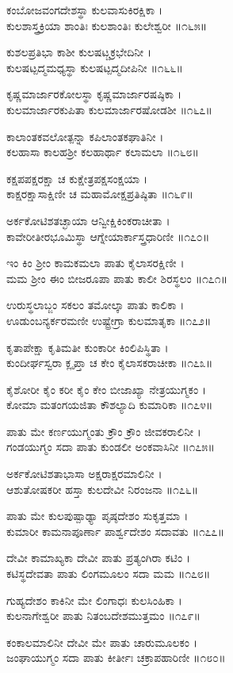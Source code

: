 ಕಂಬೋಜವಂಗದೇಶಸ್ಥಾ ಕುಲವಾಸುಕಿರಕ್ಷಿಕಾ ।\\
ಕುಲಶಾಸ್ತ್ರಕ್ರಿಯಾ ಶಾಂತಿಃ ಕುಲಶಾಂತಿಃ ಕುಲೇಶ್ವರೀ ॥೧೬೫॥

ಕುಶಲಪ್ರತಿಭಾ ಕಾಶೀ ಕುಲಷಟ್ಚಕ್ರಭೇದಿನೀ ।\\
ಕುಲಷಟ್ಪದ್ಮಮಧ್ಯಸ್ಥಾ ಕುಲಷಟ್ಪದ್ಮದೀಪಿನೀ ॥೧೬೬॥

ಕೃಷ್ಣಮಾರ್ಜಾರಕೋಲಸ್ಥಾ ಕೃಷ್ಣಮಾರ್ಜಾರಷಷ್ಠಿಕಾ ।\\
ಕುಲಮಾರ್ಜಾರಕುಪಿತಾ ಕುಲಮಾರ್ಜಾರಷೋಡಶೀ ॥೧೬೭॥

ಕಾಲಾಂತಕವಲೋತ್ಪನ್ನಾ ಕಪಿಲಾಂತಕಘಾತಿನೀ ।\\
ಕಲಹಾಸಾ ಕಾಲಹಶ್ರೀ ಕಲಹಾರ್ಥಾ ಕಲಾಮಲಾ ॥೧೬೮॥

ಕಕ್ಷಪಪಕ್ಷರಕ್ಷಾ ಚ ಕುಕ್ಷೇತ್ರಪಕ್ಷಸಂಕ್ಷಯಾ ।\\
ಕಾಕ್ಷರಕ್ಷಾಸಾಕ್ಷಿಣೀ ಚ ಮಹಾಮೋಕ್ಷಪ್ರತಿಷ್ಠಿತಾ ॥೧೬೯॥

ಅರ್ಕಕೋಟಿಶತಚ್ಛಾಯಾ ಆನ್ವೀಕ್ಷಿಕಿಂಕರಾಚೀತಾ ।\\
ಕಾವೇರೀತೀರಭೂಮಿಸ್ಥಾ ಆಗ್ನೇಯಾರ್ಕಾಸ್ತ್ರಧಾರಿಣೀ ॥೧೭೦॥

ಇಂ ಕಿಂ ಶ್ರೀಂ ಕಾಮಕಮಲಾ ಪಾತು ಕೈಲಾಸರಕ್ಷಿಣೀ ।\\
ಮಮ ಶ್ರೀಂ ಈಂ ಬೀಜರೂಪಾ ಪಾತು ಕಾಲೀ ಶಿರಸ್ಥಲಂ ॥೧೭೧॥

ಉರುಸ್ಥಲಾಬ್ಜಂ ಸಕಲಂ ತಮೋಲ್ಕಾ ಪಾತು ಕಾಲಿಕಾ ।\\
ಊಡುಂಬನ್ಯರ್ಕರಮಣೀ ಉಷ್ಟ್ರೇಗ್ರಾ ಕುಲಮಾತೃಕಾ ॥೧೭೨॥

ಕೃತಾಪೇಕ್ಷಾ ಕೃತಿಮತೀ ಕುಂಕಾರೀ ಕಿಂಲಿಪಿಸ್ಥಿತಾ ।\\
ಕುಂದೀರ್ಘಸ್ವರಾ ಕ್ಲೃಪ್ತಾ ಚ ಕೇಂ ಕೈಲಾಸಕರಾಚೀಕಾ ॥೧೭೩॥

ಕೈಶೋರೀ ಕೈಂ ಕರೀ ಕೈಂ ಕೇಂ ಬೀಜಾಖ್ಯಾ ನೇತ್ರಯುಗ್ಮಕಂ ।\\
ಕೋಮಾ ಮತಂಗಯಜಿತಾ ಕೌಶಲ್ಯಾದಿ ಕುಮಾರಿಕಾ ॥೧೭೪॥

ಪಾತು ಮೇ ಕರ್ಣಯುಗ್ಮಂತು ಕ್ರೌಂ ಕ್ರೌಂ ಜೀವಕರಾಲಿನೀ ।\\
ಗಂಡಯುಗ್ಮಂ ಸದಾ ಪಾತು ಕುಂಡಲೀ ಅಂಕವಾಸಿನೀ ॥೧೭೫॥

ಅರ್ಕಕೋಟಿಶತಾಭಾಸಾ ಅಕ್ಷರಾಕ್ಷರಮಾಲಿನೀ ।\\
ಆಶುತೋಷಕರೀ ಹಸ್ತಾ ಕುಲದೇವೀ ನಿರಂಜನಾ ॥೧೭೬॥

ಪಾತು ಮೇ ಕುಲಪುಷ್ಪಾಢ್ಯಾ ಪೃಷ್ಠದೇಶಂ ಸುಕೃತ್ತಮಾ ।\\
ಕುಮಾರೀ ಕಾಮನಾಪೂರ್ಣಾ ಪಾರ್ಶ್ವದೇಶಂ ಸದಾವತು ॥೧೭೭॥

ದೇವೀ ಕಾಮಾಖ್ಯಕಾ ದೇವೀ ಪಾತು ಪ್ರತ್ಯಂಗಿರಾ ಕಟಿಂ ।\\
ಕಟಿಸ್ಥದೇವತಾ ಪಾತು ಲಿಂಗಮೂಲಂ ಸದಾ ಮಮ ॥೧೭೮॥

ಗುಹ್ಯದೇಶಂ ಕಾಕಿನೀ ಮೇ ಲಿಂಗಾಧಃ ಕುಲಸಿಂಹಿಕಾ ।\\
ಕುಲನಾಗೇಶ್ವರೀ ಪಾತು ನಿತಂಬದೇಶಮುತ್ತಮಂ ॥೧೭೯॥

ಕಂಕಾಲಮಾಲಿನೀ ದೇವೀ ಮೇ ಪಾತು ಚಾರುಮೂಲಕಂ ।\\
ಜಂಘಾಯುಗ್ಮಂ ಸದಾ ಪಾತು ಕೀರ್ತೀಃ ಚಕ್ರಾಪಹಾರಿಣೀ ॥೧೮೦॥

